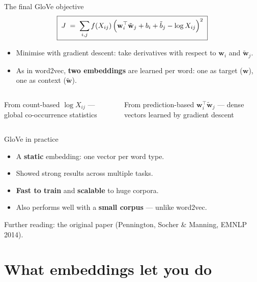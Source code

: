 \documentclass[aspectratio=169,11pt]{beamer}
\newcommand{\wv}{\mathbf{w}}
\newcommand{\cv}{\tilde{\mathbf{w}}}
\begin{document}
\begin{frame}{The final GloVe objective}
\[
  \boxed{\;J \;=\; \sum_{i,j} f(X_{ij})\,
      \Bigl( \wv_i^\top \cv_j + b_i + \tilde b_j - \log X_{ij} \Bigr)^2\;}
\]
\begin{itemize}
  \item Minimise with gradient descent: take derivatives with respect to
        $\wv_i$ and $\cv_j$.
  \item As in word2vec, \textbf{two embeddings} are learned per word: one as
        target ($\wv$), one as context ($\cv$).
\end{itemize}
\vspace{2mm}
\begin{columns}[T]
\begin{block}{From count-based}
$\log X_{ij}$ --- global co-occurrence statistics
\end{block}
\begin{block}{From prediction-based}
$\wv_i^\top \cv_j$ --- dense vectors learned by gradient descent
\end{block}
\end{columns}
\end{frame}

\begin{frame}{GloVe in practice}
\begin{itemize}
  \item A \textbf{static} embedding: one vector per word type.
  \item Showed strong results across multiple tasks.
  \item \textbf{Fast to train} and \textbf{scalable} to huge corpora.
  \item Also performs well with a \textbf{small corpus} --- unlike word2vec.
\end{itemize}
\vspace{3mm}
\small Further reading: the original paper (Pennington, Socher \& Manning,
EMNLP 2014).
\end{frame}

\section{What embeddings let you do}
\end{document}
